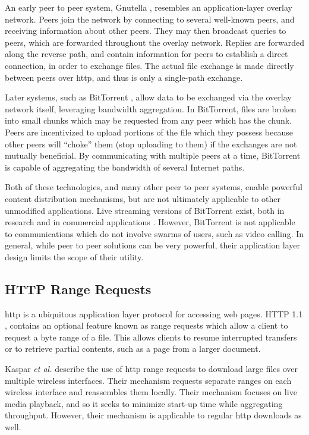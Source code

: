 \documentclass{cwru}
\begin{document}
An early peer to peer system, Gnutella \cite{adar2000free}, resembles an
application-layer overlay network. Peers join the network by connecting to
several well-known peers, and receiving information about other peers. They may
then broadcast queries to peers, which are forwarded throughout the overlay
network. Replies are forwarded along the reverse path, and contain information
for peers to establish a direct connection, in order to exchange files. The
actual file exchange is made directly between peers over \ac{http}, and thus is
only a single-path exchange.

Later systems, such as BitTorrent \cite{cohen2003incentives}, allow data to be
exchanged via the overlay network itself, leveraging bandwidth aggregation. In
BitTorrent, files are broken into small chunks which may be requested from any
peer which has the chunk. Peers are incentivized to upload portions of the file
which they possess because other peers will ``choke'' them (stop uploading to
them) if the exchanges are not mutually beneficial. By communicating with
multiple peers at a time, BitTorrent is capable of aggregating the bandwidth of
several Internet paths.

Both of these technologies, and many other peer to peer systems, enable powerful
content distribution mechanisms, but are not ultimately applicable to other
unmodified applications. Live streaming versions of BitTorrent exist, both in
research \cite{mol2009design} and in commercial applications
\cite{ruckert2014clubbing}. However, BitTorrent is not applicable to
communications which do not involve swarms of users, such as video calling. In
general, while peer to peer solutions can be very powerful, their application
layer design limits the scope of their utility.

\subsection{HTTP Range Requests}

\ac{http} is a ubiquitous application layer protocol for accessing web pages.
HTTP 1.1 \cite{rfc2616}, contains an optional feature known as range requests
\cite{rfc7233} which allow a client to request a byte range of a file. This
allows clients to resume interrupted transfers or to retrieve partial contents,
such as a page from a larger document.

Kaspar \textit{et al.} \cite{kaspar2010enhancing} describe the use of \ac{http}
range requests to download large files over multiple wireless interfaces. Their
mechanism requests separate ranges on each wireless interface and reassembles
them locally. Their mechanism focuses on live media playback, and so it seeks to
minimize start-up time while aggregating throughput. However, their mechanism is
applicable to regular \ac{http} downloads as well.
\end{document}
